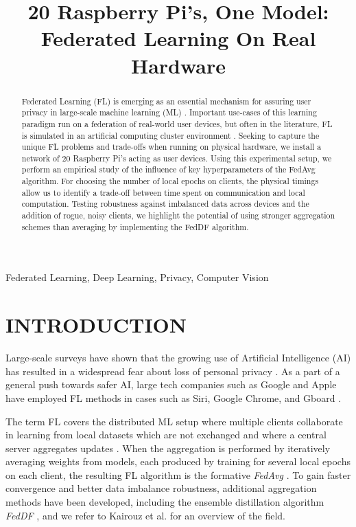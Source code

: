 \documentclass{article}
\title{20 Raspberry Pi's, One Model: Federated Learning On Real Hardware}
\begin{document}
%

\maketitle
%
\begin{abstract}
    Federated Learning (FL) is emerging as an essential mechanism for assuring user privacy in large-scale machine learning (ML) \cite{kai2021advances}.
    Important use-cases of this learning paradigm run on a federation of real-world user devices, but often in the literature, FL is simulated in an artificial computing cluster environment \cite{kai2021advances,mcmahan2017communication,lin2020ensemble}.
    Seeking to capture the unique FL problems and trade-offs when running on physical hardware, we install a network of 20 Raspberry Pi's acting as user devices.
    Using this experimental setup, we perform an empirical study of the influence of key hyperparameters of the FedAvg \cite{mcmahan2017communication} algorithm.
    For choosing the number of local epochs on clients, the physical timings allow us to identify a trade-off between time spent on communication and local computation.
    Testing robustness against imbalanced data across devices and the addition of rogue, noisy clients, we highlight the potential of using stronger aggregation schemes than averaging by implementing the FedDF \cite{lin2020ensemble} algorithm.
\end{abstract}
%
\begin{keywords}
    Federated Learning, Deep Learning, Privacy, Computer Vision
\end{keywords}


\section{INTRODUCTION}
\label{sec:intro}
Large-scale surveys have shown that the growing use of Artificial Intelligence (AI) has resulted in a widespread fear about loss of personal privacy \cite{beuc2020consumers, west2018survey}.
As a part of a general push towards safer AI, large tech companies such as Google and Apple have employed FL methods in cases such as Siri, Google Chrome, and Gboard \cite{kai2021advances}.

The term FL covers the distributed ML setup where multiple clients collaborate in learning from local datasets which are not exchanged and where a central server aggregates updates \cite{kai2021advances, mcmahan2017communication}.
When the aggregation is performed by iteratively averaging weights from models, each produced by training for several local epochs on each client, the resulting FL algorithm is the formative \emph{FedAvg} \cite{mcmahan2017communication}.
To gain faster convergence and better data imbalance robustness, additional aggregation methods have been developed, including the ensemble distillation algorithm \emph{FedDF} \cite{lin2020ensemble}, and we refer to Kairouz et al. for an overview of the field\cite{kai2021advances}.
\end{document}
